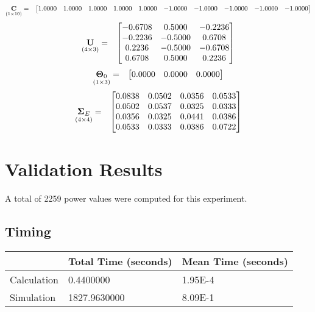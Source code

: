 \documentclass{glimmpse-report}
\begin{document}
\begin{eqnarray*}
\underset{\left(1\times10\right)}{\mathbf{C}} & = & \begin{bmatrix}1.0000 & 1.0000 & 1.0000 & 1.0000 & 1.0000 & -1.0000 & -1.0000 & -1.0000 & -1.0000 & -1.0000\protect\\
\end{bmatrix}
\end{eqnarray*}
\begin{eqnarray*}
\underset{\left(4\times3\right)}{\mathbf{U}} & = & \begin{bmatrix}-0.6708 & 0.5000 & -0.2236\protect\\
-0.2236 & -0.5000 & 0.6708\protect\\
0.2236 & -0.5000 & -0.6708\protect\\
0.6708 & 0.5000 & 0.2236\protect\\
\end{bmatrix}
\end{eqnarray*}
\begin{eqnarray*}
\underset{\left(1\times3\right)}{\mathbf{\Theta}_0} & = & \begin{bmatrix}0.0000 & 0.0000 & 0.0000\protect\\
\end{bmatrix}
\end{eqnarray*}
\begin{eqnarray*}
\underset{\left(4\times4\right)}{\mathbf{\Sigma}_E} & = & \begin{bmatrix}0.0838 & 0.0502 & 0.0356 & 0.0533\protect\\
0.0502 & 0.0537 & 0.0325 & 0.0333\protect\\
0.0356 & 0.0325 & 0.0441 & 0.0386\protect\\
0.0533 & 0.0333 & 0.0386 & 0.0722\protect\\
\end{bmatrix}
\end{eqnarray*}
\section{Validation Results}
A total of 2259 power values were computed for this experiment.

\subsection{Timing}
\begin{tabular}{|l|l|l|}
\hline
 & Total Time (seconds) & Mean Time (seconds) \\ 
\hline
Calculation & 0.4400000 & 1.95E-4\tabularnewline
\hline
Simulation & 1827.9630000 & 8.09E-1\tabularnewline
\hline
\end{tabular}
\end{document}
